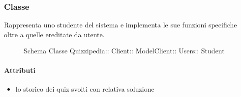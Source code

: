 \subsubsection{Classe }
Rappresenta uno studente del sistema e implementa le sue funzioni specifiche oltre a quelle ereditate da utente.
\begin{figure}[H]
\centering
\noindent{}
\caption[Schema Classe Student]{Schema Classe Quizzipedia:: Client:: ModelClient:: Users:: Student}
\end{figure}
\paragraph{Attributi}
\begin{itemize}
\item {}
\newline
lo storico dei quiz svolti con relativa soluzione
\end{itemize}

